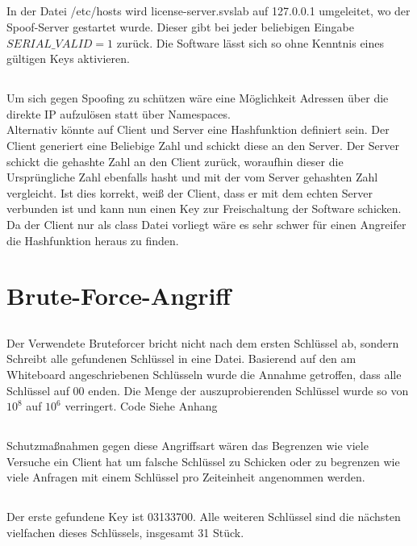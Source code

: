 \documentclass[12pt]{article}
\theoremstyle{plain}
\begin{document}
\subsection{}
In der Datei /etc/hosts wird license-server.svslab auf 127.0.0.1 umgeleitet, wo der Spoof-Server gestartet wurde. Dieser gibt bei jeder beliebigen Eingabe $SERIAL\_VALID=1$ zurück. Die Software lässt sich so ohne Kenntnis eines gültigen Keys aktivieren.
\subsection{}
Um sich  gegen Spoofing zu schützen wäre eine Möglichkeit Adressen über die direkte IP aufzulösen statt über Namespaces.\\
Alternativ könnte auf Client und Server eine Hashfunktion definiert sein. Der Client generiert eine Beliebige Zahl und schickt diese an den Server. Der Server schickt die gehashte Zahl an den Client zurück, woraufhin dieser die Ursprüngliche Zahl ebenfalls hasht und mit der vom Server gehashten Zahl vergleicht. Ist dies korrekt, weiß der Client, dass er mit dem echten Server verbunden ist und kann nun einen Key zur Freischaltung der Software schicken. Da der Client nur als class Datei vorliegt wäre es sehr schwer für einen Angreifer die Hashfunktion heraus zu finden.
\section{Brute-Force-Angriff}
\subsection{}
Der Verwendete Bruteforcer bricht nicht nach dem ersten Schlüssel ab, sondern Schreibt alle gefundenen Schlüssel in eine Datei. Basierend auf den am Whiteboard angeschriebenen Schlüsseln wurde die Annahme getroffen, dass alle Schlüssel auf 00 enden. Die Menge der auszuprobierenden Schlüssel wurde so von $10^8$ auf $10^6$ verringert. Code Siehe Anhang
\subsection{}
Schutzmaßnahmen gegen diese Angriffsart wären das Begrenzen wie viele Versuche ein Client hat um falsche Schlüssel zu Schicken oder zu begrenzen wie viele Anfragen mit einem Schlüssel pro Zeiteinheit angenommen werden.
\subsection{}
Der erste gefundene Key ist 03133700. Alle weiteren Schlüssel sind die nächsten vielfachen dieses Schlüssels, insgesamt 31 Stück.
\end{document}
